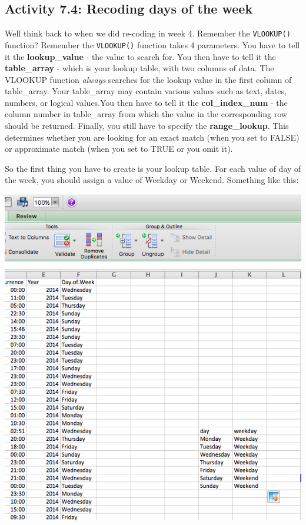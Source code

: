 \documentclass[
]{book}
\begin{document}
\hypertarget{activity-7.4-recoding-days-of-the-week}{%
\subsection{Activity 7.4: Recoding days of the week}\label{activity-7.4-recoding-days-of-the-week}}

Well think back to when we did re-coding in week 4. Remember the \texttt{VLOOKUP()} function? Remember the \texttt{VLOOKUP()} function takes 4 parameters. You have to tell it the \textbf{lookup\_value} - the value to search for. You then have to tell it the \textbf{table\_array} - which is your lookup table, with two columns of data. The VLOOKUP function \emph{always} searches for the lookup value in the first column of table\_array. Your table\_array may contain various values such as text, dates, numbers, or logical values.You then have to tell it the \textbf{col\_index\_num} - the column number in table\_array from which the value in the corresponding row should be returned. Finally, you still have to specify the \textbf{range\_lookup}. This determines whether you are looking for an exact match (when you set to FALSE) or approximate match (when you set to TRUE or you omit it).

So the first thing you have to create is your lookup table. For each value of day of the week, you should assign a value of Weekday or Weekend. Something like this:

\includegraphics{imgs/wkday_lookup.png}
\end{document}
